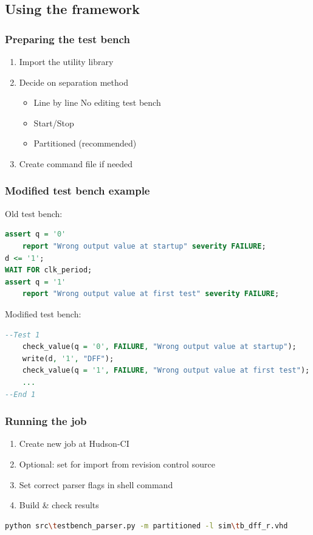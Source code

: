 \documentclass[british,10pt]{beamer}
\begin{document}
\subsection{Using the framework}

\begin{frame}\frametitle{Preparing the test bench}
\begin{enumerate}
\item Import the utility library
\item Decide on separation method
\begin{itemize}
\item Line by line  No editing test bench
\item Start/Stop
\item Partitioned (recommended)
\end{itemize}
\item Create command file if needed
\end{enumerate}
\end{frame}


\begin{frame}[fragile]\frametitle{Modified test bench example}
Old test bench:
\begin{lstlisting}[language=VHDL, tabsize=4, frame=single, framesep=2mm, belowskip=5pt, aboveskip=5pt, showstringspaces=false, basicstyle=\scriptsize]
assert q = '0'
    report "Wrong output value at startup" severity FAILURE;
d <= '1';
WAIT FOR clk_period;
assert q = '1'
    report "Wrong output value at first test" severity FAILURE;
\end{lstlisting}
\vskip1pt
Modified test bench:
\begin{lstlisting}[language=VHDL, tabsize=4, frame=single, framesep=2mm, belowskip=5pt, aboveskip=5pt, showstringspaces=false, basicstyle=\scriptsize]
--Test 1
    check_value(q = '0', FAILURE, "Wrong output value at startup");
    write(d, '1', "DFF");
    check_value(q = '1', FAILURE, "Wrong output value at first test");
    ...
--End 1
\end{lstlisting}
\end{frame}


\begin{frame}[fragile]\frametitle{Running the job}
\begin{enumerate}
\item Create new job at Hudson-CI 
\item Optional: set for import from revision control source
\item Set correct parser flags in shell command
\item Build \& check results
\end{enumerate}
\vskip5pt
\begin{lstlisting}[language=bash, tabsize=4, frame=single, framesep=2mm, belowskip=8pt, aboveskip=8pt, showstringspaces=false, basicstyle=\scriptsize]
python src\testbench_parser.py -m partitioned -l sim\tb_dff_r.vhd
\end{lstlisting}
\end{frame}
\end{document}
